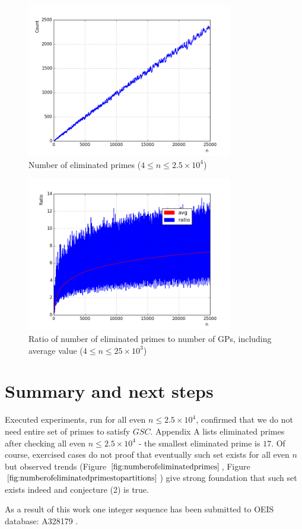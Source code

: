\documentclass[10pt,twocolumn]{article}
\begin{document}
\begin{figure}[!ht]
\centering
\captionsetup{justification=centering}
\includegraphics[width=9cm]{f_number_of_eliminated_primes}
\caption[caption]{Number of eliminated primes ($4 \leq n \leq 2.5 \times 10^4$)}
\label{fig:numberofeliminatedprimes}
\end{figure}

\begin{figure}[!ht]
\centering
\captionsetup{justification=centering}
\includegraphics[width=9cm]{f_eliminated_primes_to_partitions}
\caption[caption]{Ratio of number of eliminated primes to number of GPs, including average value ($4 \leq n \leq 25 \times 10^3$)}
\label{fig:numberofeliminatedprimestopartitions}
\end{figure}

\section{Summary and next steps}

Executed experiments, run for all even $n \leq 2.5 \times 10^4$, confirmed that we do not need entire set of primes to satisfy $GSC$. Appendix A lists eliminated primes after checking all even $n \leq 2.5 \times 10^4$ - the smallest eliminated prime is $17$. Of course, exercised cases do not proof that eventually such set exists for all even $n$ but observed trends (Figure $\ref{fig:numberofeliminatedprimes}$, Figure $\ref{fig:numberofeliminatedprimestopartitions}$) give strong foundation that such set exists indeed and conjecture (2) is true. \par
As a result of this work one integer sequence has been submitted to OEIS database: A328179 \cite{A328179}. 
\end{document}
